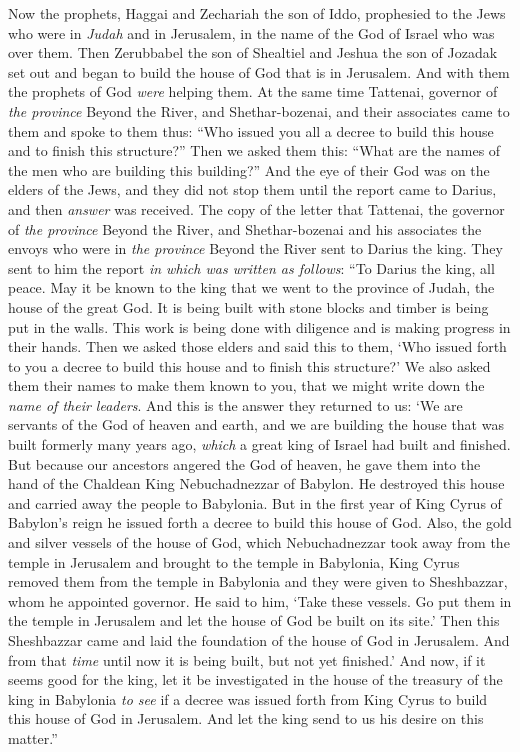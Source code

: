 \begin{biblechapter} %
 Now the prophets, Haggai and Zechariah the son of Iddo, prophesied to the Jews who were in \textit{Judah} and in Jerusalem, in the name of the God of Israel who was over them.
\verse Then Zerubbabel the son of Shealtiel and Jeshua the son of Jozadak set out and began to build the house of God that is in Jerusalem. And with them the prophets of God \textit{were} helping them.
\verse At the same time Tattenai, governor of \textit{the province} Beyond the River, and Shethar-bozenai, and their associates came to them and spoke to them thus: “Who issued you all a decree to build this house and to finish this structure?”
\verse Then we asked them this: “What are the names of the men who are building this building?”
\verse And the eye of their God was on the elders of the Jews, and they did not stop them until the report came to Darius, and then \textit{answer} was received.
\verse The copy of the letter that Tattenai, the governor of \textit{the province} Beyond the River, and Shethar-bozenai and his associates the envoys who were in \textit{the province} Beyond the River sent to Darius the king.
\verse They sent to him the report \textit{in which was written as follows}: “To Darius the king, all peace.
\verse May it be known to the king that we went to the province of Judah, the house of the great God. It is being built with stone blocks and timber is being put in the walls. This work is being done with diligence and is making progress in their hands.
\verse Then we asked those elders and said this to them, ‘Who issued forth to you a decree to build this house and to finish this structure?’
\verse We also asked them their names to make them known to you, that we might write down the \textit{name of their leaders}.
\verse And this is the answer they returned to us: ‘We are servants of the God of heaven and earth, and we are building the house that was built formerly many years ago, \textit{which} a great king of Israel had built and finished.
\verse But because our ancestors angered the God of heaven, he gave them into the hand of the Chaldean King Nebuchadnezzar of Babylon. He destroyed this house and carried away the people to Babylonia.
\verse But in the first year of King Cyrus of Babylon’s reign he issued forth a decree to build this house of God.
\verse Also, the gold and silver vessels of the house of God, which Nebuchadnezzar took away from the temple in Jerusalem and brought to the temple in Babylonia, King Cyrus removed them from the temple in Babylonia and they were given to Sheshbazzar, whom he appointed governor.
\verse He said to him, ‘Take these vessels. Go put them in the temple in Jerusalem and let the house of God be built on its site.’
\verse Then this Sheshbazzar came and laid the foundation of the house of God in Jerusalem. And from that \textit{time} until now it is being built, but not yet finished.’
\verse And now, if it seems good for the king, let it be investigated in the house of the treasury of the king in Babylonia \textit{to see} if a decree was issued forth from King Cyrus to build this house of God in Jerusalem. And let the king send to us his desire on this matter.”
\end{biblechapter}

